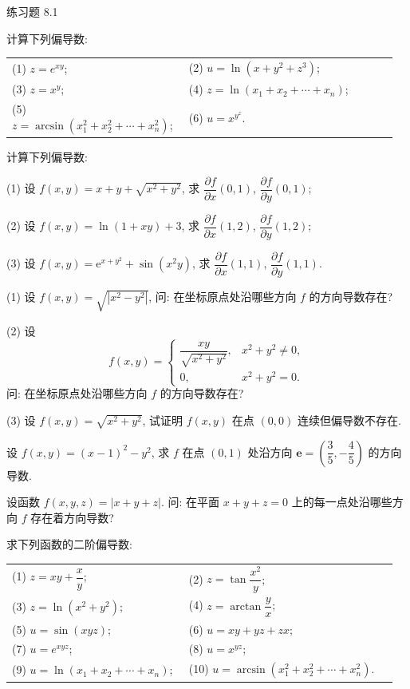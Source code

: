 \begin{exblock}{练习题 8.1}
  \item 计算下列偏导数:

  \begin{tabular}{@{}p{0.44\linewidth}p{0.52\linewidth}@{}}
    (1) $z = e^{xy}$; & (2) $u = \ln(x + y^{2} + z^{3})$; \\
    (3) $z = x^{y}$; & (4) $z = \ln(x_{1} + x_{2} + \cdots + x_{n})$; \\
    (5) $z = \arcsin(x_{1}^{2} + x_{2}^{2} + \cdots + x_{n}^{2})$; & (6) $u = x^{y^{z}}$.
  \end{tabular}

  \item 计算下列偏导数:

  (1) 设 $f(x, y) = x + y + \sqrt{x^{2} + y^{2}}$, 求 $\dfrac{\partial f}{\partial x}(0, 1)$, $\dfrac{\partial f}{\partial y}(0, 1)$;

  (2) 设 $f(x, y) = \ln(1 + xy) + 3$, 求 $\dfrac{\partial f}{\partial x}(1, 2)$, $\dfrac{\partial f}{\partial y}(1, 2)$;

  (3) 设 $f(x, y) = \mathrm{e}^{x + y^{2}} + \sin(x^{2}y)$, 求 $\dfrac{\partial f}{\partial x}(1, 1)$, $\dfrac{\partial f}{\partial y}(1, 1)$.

  \item (1) 设 $f(x, y) = \sqrt{|x^{2} - y^{2}|}$, 问: 在坐标原点处沿哪些方向 $f$ 的方向导数存在?

  (2) 设
  \[
    f(x, y) = \begin{cases}
      \dfrac{xy}{\sqrt{x^{2} + y^{2}}}, & x^{2} + y^{2} \neq 0, \\[2.5mm]
      0, & x^{2} + y^{2} = 0.
    \end{cases}
  \]
  问: 在坐标原点处沿哪些方向 $f$ 的方向导数存在?

  (3) 设 $f(x, y) = \sqrt{x^{2} + y^{2}}$, 试证明 $f(x, y)$ 在点 $(0, 0)$ 连续但偏导数不存在.

  \item 设 $f(x, y) = (x - 1)^{2} - y^{2}$, 求 $f$ 在点 $(0, 1)$ 处沿方向 $\boldsymbol{e} = \left(\dfrac{3}{5}, -\dfrac{4}{5}\right)$ 的方向导数.

  \item 设函数 $f(x, y, z) = |x + y + z|$. 问: 在平面 $x + y + z = 0$ 上的每一点处沿哪些方向 $f$ 存在着方向导数?

  \item 求下列函数的二阶偏导数:

  \begin{tabular}{@{}p{0.44\linewidth}p{0.52\linewidth}@{}}
    (1) $z = xy + \dfrac{x}{y}$; & (2) $z = \tan\dfrac{x^{2}}{y}$; \\[2.5mm]
    (3) $z = \ln(x^{2} + y^{2})$; & (4) $z = \arctan\dfrac{y}{x}$; \\[2.5mm]
    (5) $u = \sin(xyz)$; & (6) $u = xy + yz + zx$; \\
    (7) $u = e^{xyz}$; & (8) $u = x^{yz}$; \\
    (9) $u = \ln(x_{1} + x_{2} + \cdots + x_{n})$; & (10) $u = \arcsin(x_{1}^{2} + x_{2}^{2} + \cdots + x_{n}^{2})$.
  \end{tabular}


\end{exblock}
